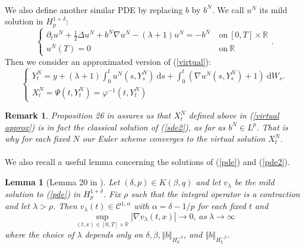 \documentclass[12pt]{article}
\newtheorem{lem}[theo]{Lemma}
\newtheorem{rem}{Remark}
\newcommand{\norme}[1]{\left\Vert #1\right\Vert}
\newcommand{\R}{\mathbb{R}}
\newcommand{\di}{\mathrm{d}}
\begin{document}
        \paragraph{}
        We also define another similar PDE by replacing $b$ by $b^N$. We call $u^N$ its mild solution in $H_p^{1+\delta}$:
        \begin{equation}\label{pde2}
        \begin{cases}
        \partial_t u^N + \frac{1}{2}\Delta u^N + b^N\nabla u^N - (\lambda+1)u^N = -b^N\ &\mathrm{on}\ [0,T]\times\R\\
        u^N(T) = 0\ &\mathrm{on}\ \R
        \end{cases}.
        \end{equation}
        Then we consider an approximated version of (\ref{virtual}): \begin{equation}\label{virtual approx}
        \begin{cases}
        Y_t^N = y + (\lambda+1)\int_0^t u^N\left(s,Y_s^N\right)\ \di s +\int_0^t \left(\nabla u^N\left(s,Y_s^N\right)+1\right)\ \di W_s.\\
        X_t^N = \Psi(t,Y_t^N) = \varphi^{-1}(t,Y_t^N)
        \end{cases}
        \end{equation}
        
        \begin{rem}
            Proposition 26 in \cite{Fla-Iss-Rus-2017} assures us that $X^N_t$ defined above in (\ref{virtual approx}) is in fact the classical solution of (\ref{sde2}), as far as $b^N\in L^p$. That is why for each fixed $N$ our Euler scheme converges to the virtual solution $X^N_t$.
        \end{rem}
    
    \paragraph{}              
    We also recall a useful lemma concerning the solutions of (\ref{pde}) and (\ref{pde2}).
    
    \begin{lem}[Lemma 20 in \cite{Fla-Iss-Rus-2017}]\label{lem}
        Let $(\delta,p)\in K(\beta,q)$ and let $v_\lambda$ be the mild solution to (\ref{pde}) in $H_p^{1+\delta}$. Fix $\rho$ such that the integral operator is a contraction and let $\lambda>\rho$. Then $v_\lambda(t)\in\mathcal{C}^{1,\alpha}$ with $\alpha=\delta-1/p$ for each fixed $t$ and 
        \begin{equation*}
        \underset{(t,x)\in[0,T]\times\R}{\sup} |\nabla v_\lambda(t,x)| \rightarrow 0,\ as\ \lambda \rightarrow \infty
        \end{equation*}
        where the choice of $\lambda$ depends only on $\delta,\beta,\norme{b}_{H_p^{-\beta}}$, and $\norme{b}_{H_q^{-\beta}}$.
    \end{lem}
    
\end{document}
